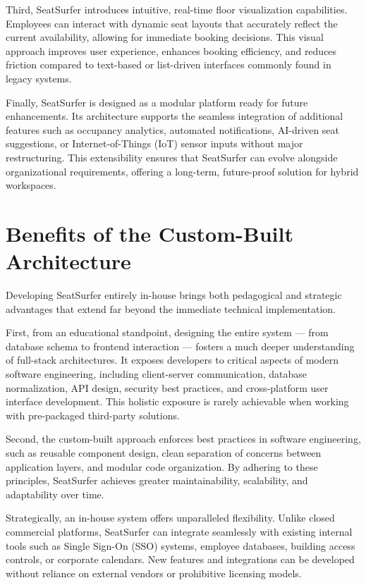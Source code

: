 \documentclass[12pt,a4paper]{report}
\begin{document}
Third, SeatSurfer introduces intuitive, real-time floor visualization capabilities. Employees can interact with dynamic seat layouts that accurately reflect the current availability, allowing for immediate booking decisions. This visual approach improves user experience, enhances booking efficiency, and reduces friction compared to text-based or list-driven interfaces commonly found in legacy systems.

Finally, SeatSurfer is designed as a modular platform ready for future enhancements. Its architecture supports the seamless integration of additional features such as occupancy analytics, automated notifications, AI-driven seat suggestions, or Internet-of-Things (IoT) sensor inputs without major restructuring. This extensibility ensures that SeatSurfer can evolve alongside organizational requirements, offering a long-term, future-proof solution for hybrid workspaces.

\section{Benefits of the Custom-Built Architecture}

Developing SeatSurfer entirely in-house brings both pedagogical and strategic advantages that extend far beyond the immediate technical implementation.

First, from an educational standpoint, designing the entire system — from database schema to frontend interaction — fosters a much deeper understanding of full-stack architectures. It exposes developers to critical aspects of modern software engineering, including client-server communication, database normalization, API design, security best practices, and cross-platform user interface development. This holistic exposure is rarely achievable when working with pre-packaged third-party solutions.

Second, the custom-built approach enforces best practices in software engineering, such as reusable component design, clean separation of concerns between application layers, and modular code organization. By adhering to these principles, SeatSurfer achieves greater maintainability, scalability, and adaptability over time.

Strategically, an in-house system offers unparalleled flexibility. Unlike closed commercial platforms, SeatSurfer can integrate seamlessly with existing internal tools such as Single Sign-On (SSO) systems, employee databases, building access controls, or corporate calendars. New features and integrations can be developed without reliance on external vendors or prohibitive licensing models.
\end{document}
